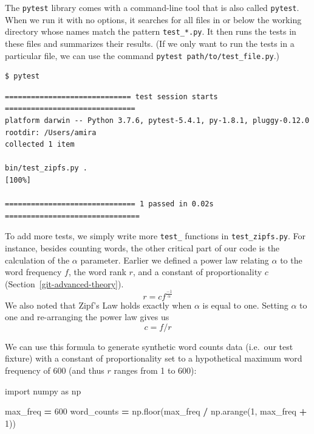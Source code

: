 \documentclass[
]{krantz}
\makeatletter
\newenvironment{Shaded}{\begin{snugshade}}{\end{snugshade}}
\newcommand{\DecValTok}[1]{\textcolor[rgb]{0.00,0.00,0.81}{#1}}
\newcommand{\ImportTok}[1]{#1}
\newcommand{\NormalTok}[1]{#1}
\newcommand{\OperatorTok}[1]{\textcolor[rgb]{0.81,0.36,0.00}{\textbf{#1}}}
\newenvironment{kframe}{%
\medskip{}
\setlength{\fboxsep}{.8em}
 \def\at@end@of@kframe{}%
 \ifinner\ifhmode%
  \def\at@end@of@kframe{\end{minipage}}%
  \begin{minipage}{\columnwidth}%
 \fi\fi%
 \def\FrameCommand##1{\hskip\@totalleftmargin \hskip-\fboxsep
 \colorbox{shadecolor}{##1}\hskip-\fboxsep
     \hskip-\linewidth \hskip-\@totalleftmargin \hskip\columnwidth}%
 \MakeFramed {\advance\hsize-\width
   \@totalleftmargin\z@ \linewidth\hsize
   \@setminipage}}%
 {\par\unskip\endMakeFramed%
 \at@end@of@kframe}
\renewenvironment{Shaded}{\begin{kframe}}{\end{kframe}}
\makeatother
\begin{document}
The \texttt{pytest} library comes with a command-line tool that is also called \texttt{pytest}.
When we run it with no options,
it searches for all files in or below the working directory
whose names match the pattern \texttt{test\_*.py}.
It then runs the tests in these files and summarizes their results.
(If we only want to run the tests in a particular file,
we can use the command \texttt{pytest\ path/to/test\_file.py}.)

\begin{verbatim}
$ pytest
\end{verbatim}

\begin{verbatim}
============================= test session starts ==============================
platform darwin -- Python 3.7.6, pytest-5.4.1, py-1.8.1, pluggy-0.12.0
rootdir: /Users/amira
collected 1 item                                                               

bin/test_zipfs.py .                                                      [100%]

============================== 1 passed in 0.02s ===============================
\end{verbatim}

To add more tests,
we simply write more \texttt{test\_} functions in \texttt{test\_zipfs.py}.
For instance,
besides counting words,
the other critical part of our code is the calculation of the \(\alpha\) parameter.
Earlier we defined a power law relating \(\alpha\)
to the word frequency \(f\),
the word rank \(r\),
and a constant of proportionality \(c\) (Section~\ref{git-advanced-theory}).\[
r = cf^{\frac{-1}{\alpha}}
\]
We also noted that Zipf's Law holds exactly when \(\alpha\) is equal to one.
Setting \(\alpha\) to one and re-arranging the power law gives us\[
c = f/r
\]

We can use this formula to generate synthetic word counts data
(i.e.~our test fixture)
with a constant of proportionality set to a hypothetical maximum word frequency of 600
(and thus \(r\) ranges from 1 to 600):

\begin{Shaded}
\begin{Highlighting}[]
\ImportTok{import}\NormalTok{ numpy }\ImportTok{as}\NormalTok{ np}

\NormalTok{max\_freq }\OperatorTok{=} \DecValTok{600}
\NormalTok{word\_counts }\OperatorTok{=}\NormalTok{ np.floor(max\_freq }\OperatorTok{/}\NormalTok{ np.arange(}\DecValTok{1}\NormalTok{, max\_freq }\OperatorTok{+} \DecValTok{1}\NormalTok{)) }
\end{Highlighting}
\end{Shaded}
\end{document}
